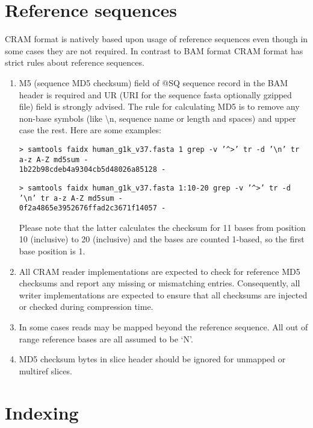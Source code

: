 \documentclass[a4paper]{article}
\begin{document}
\section{\textbf{Reference sequences}}

CRAM format is natively based upon usage of reference sequences even though in 
some cases they are not required. In contrast to BAM format CRAM format has strict 
rules about reference sequences. 

\begin{enumerate}
\item M5 (sequence MD5 checksum) field of @SQ sequence record in the BAM header is 
required and UR (URI for the sequence fasta optionally gzipped file) field is strongly 
advised. The rule for calculating MD5 is to remove any non-base symbols (like \textbackslash{}n, 
sequence name or length and spaces) and upper case the rest. Here are some examples: 

\texttt{> samtools faidx human\_g1k\_v37.fasta 1 \textbar{} grep -v '\textasciicircum{}>' \textbar{} tr -d '\textbackslash{}n' \textbar{} tr a-z A-Z \textbar{} md5sum -\\
1b22b98cdeb4a9304cb5d48026a85128  -}

\texttt{> samtools faidx human\_g1k\_v37.fasta 1:10-20 \textbar{}grep -v '\textasciicircum{}\texttt{>}' \textbar{}tr -d '\textbackslash{}n' \textbar{}tr a-z A-Z \textbar{}md5sum -\\
0f2a4865e3952676ffad2c3671f14057  -}

Please note that the latter calculates the checksum for 11 bases from position 
10 (inclusive) to 20 (inclusive) and the bases are counted 1-based, so the first 
base position is 1. 

\item All CRAM reader implementations are expected to check for reference MD5 checksums 
and report any missing or mismatching entries. Consequently, all writer implementations 
are expected to ensure that all checksums are injected or checked during compression 
time. 

\item In some cases reads may be mapped beyond the reference sequence. All out of 
range reference bases are all assumed to be `N'. 

\item MD5 checksum bytes in slice header should be ignored for unmapped or multiref 
slices. 
\end{enumerate}

\section{\textbf{Indexing}}
\end{document}
